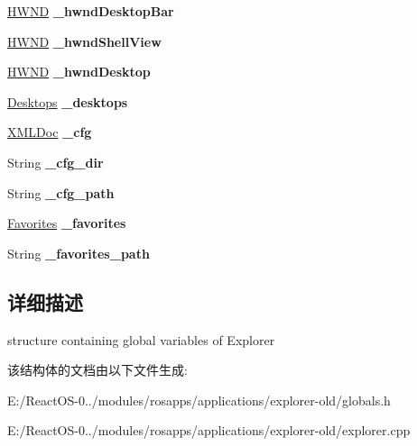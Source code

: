 \begin{DoxyCompactItemize}
\hyperlink{interfacevoid}{H\+W\+ND} {\bfseries \+\_\+hwnd\+Desktop\+Bar}
\item 
\mbox{\label{struct_explorer_globals_ad1fe812335947a58b25ef71a7e76fb7c}} 
\hyperlink{interfacevoid}{H\+W\+ND} {\bfseries \+\_\+hwnd\+Shell\+View}
\item 
\mbox{\label{struct_explorer_globals_aed43257b6b90c2b5abe9d6995218188d}} 
\hyperlink{interfacevoid}{H\+W\+ND} {\bfseries \+\_\+hwnd\+Desktop}
\item 
\mbox{\label{struct_explorer_globals_a229a00174b1c23b52103bf75d3ebcb31}} 
\hyperlink{struct_desktops}{Desktops} {\bfseries \+\_\+desktops}
\item 
\mbox{\label{struct_explorer_globals_a653fcebdb29b9e7af92c076725149965}} 
\hyperlink{struct_x_m_l_storage_1_1_x_m_l_doc}{X\+M\+L\+Doc} {\bfseries \+\_\+cfg}
\item 
\mbox{\label{struct_explorer_globals_a292c3979061964de49a1bdb08f40554b}} 
String {\bfseries \+\_\+cfg\+\_\+dir}
\item 
\mbox{\label{struct_explorer_globals_acd56bfe5fc18876dc829f272f5d63303}} 
String {\bfseries \+\_\+cfg\+\_\+path}
\item 
\mbox{\label{struct_explorer_globals_ae72b4bf5929be0f8567e80938a301f31}} 
\hyperlink{struct_favorites}{Favorites} {\bfseries \+\_\+favorites}
\item 
\mbox{\label{struct_explorer_globals_a23f487b6090271163a125a9c5ef9696e}} 
String {\bfseries \+\_\+favorites\+\_\+path}
\end{DoxyCompactItemize}


\subsection{详细描述}
structure containing global variables of Explorer 

该结构体的文档由以下文件生成\+:\begin{DoxyCompactItemize}
\item 
E\+:/\+React\+O\+S-\/0../modules/rosapps/applications/explorer-\/old/globals.\+h\item 
E\+:/\+React\+O\+S-\/0../modules/rosapps/applications/explorer-\/old/explorer.\+cpp\end{DoxyCompactItemize}
